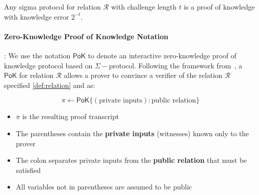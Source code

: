 \begin{theorem}
\label{thm:sigma-pok}
Any sigma protocol for relation $\mathcal{R}$ with challenge length $t$ is a proof of knowledge with knowledge error $2^{-t}$.
\end{theorem}


\paragraph{Zero-Knowledge Proof of Knowledge Notation}: We use the notation $\mathsf{PoK}$ to denote an interactive zero-knowledge proof of knowledge protocol based on $\Sigma-$protocol. Following the framework from~\cite{damgard_sigma_2010, DBLP:conf/eurocrypt/CamenischM99}, a $\mathsf{PoK}$ for relation $\mathcal{R}$ allows a prover to convince a verifier of the relation $\mathcal{R}$ specified \ref{def:relation} and as:

$$\pi \gets \mathsf{PoK}\{(\text{private inputs}) : \text{public relation}\}$$

\begin{itemize}
    \item $\pi$ is the resulting proof transcript
    \item The parentheses contain the \textbf{private inputs} (witnesses) known only to the prover  
    \item The colon separates private inputs from the \textbf{public relation} that must be satisfied
    \item All variables not in parentheses are assumed to be public
\end{itemize}

